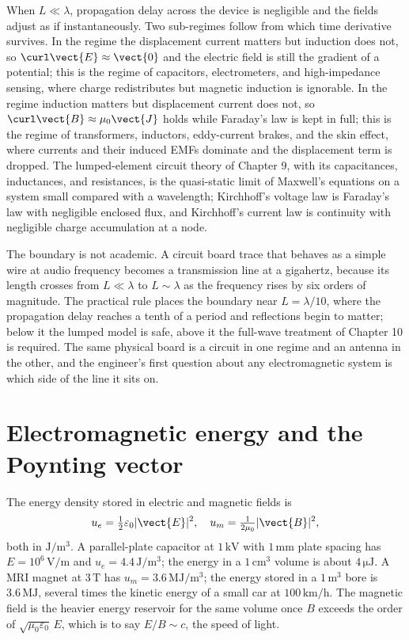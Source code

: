 

When $L\ll\lambda$, propagation delay across the device is negligible and
the fields adjust as if instantaneously. Two sub-regimes follow from
which time derivative survives. In the 
regime the displacement current matters but induction does not, so
$\curl\vect{E}\approx\vect{0}$ and the electric field is still the
gradient of a potential; this is the regime of capacitors, electrometers,
and high-impedance sensing, where charge redistributes but magnetic
induction is ignorable. In the  regime
induction matters but displacement current does not, so
$\curl\vect{B}\approx\mu_0\vect{J}$ holds while Faraday's law is kept in
full; this is the regime of transformers, inductors, eddy-current brakes,
and the skin effect, where currents and their induced EMFs dominate and
the displacement term is dropped. The lumped-element circuit theory of
Chapter 9, with its capacitances, inductances, and resistances, is the
quasi-static limit of Maxwell's equations on a system small compared with
a wavelength; Kirchhoff's voltage law is Faraday's law with negligible
enclosed flux, and Kirchhoff's current law is continuity with negligible
charge accumulation at a node.

The boundary is not academic. A circuit board trace that behaves as a
simple wire at audio frequency becomes a transmission line at a
gigahertz, because its length crosses from $L\ll\lambda$ to
$L\sim\lambda$ as the frequency rises by six orders of magnitude. The
practical rule places the boundary near $L = \lambda/10$, where the
propagation delay reaches a tenth of a period and reflections begin to
matter; below it the lumped model is safe, above it the full-wave
treatment of Chapter 10 is required. The same physical board is a circuit
in one regime and an antenna in the other, and the engineer's first
question about any electromagnetic system is which side of the line it
sits on.

\section{Electromagnetic energy and the Poynting vector}

The energy density stored in electric and magnetic fields is
\[
u_{e} = \tfrac{1}{2}\varepsilon_{0}|\vect{E}|^{2}, \quad u_{m} =
\tfrac{1}{2\mu_{0}}|\vect{B}|^{2},
\]
both in $\si{\joule\per\meter\cubed}$. A parallel-plate capacitor at
$1\,\si{\kilo\volt}$ with $1\,\si{\milli\meter}$ plate spacing has
$E = 10^{6}\,\si{\volt\per\meter}$ and $u_{e} = 4.4\,\si{\joule\per
\meter\cubed}$; the energy in a $1\,\si{\centi\meter\cubed}$ volume is
about $4\,\si{\micro\joule}$. A MRI magnet at $3\,\si{\tesla}$ has
$u_{m} = 3.6\,\si{\mega\joule\per\meter\cubed}$; the energy stored in a
$1\,\si{\meter\cubed}$ bore is $3.6\,\si{\mega\joule}$, several times
the kinetic energy of a small car at $100\,\si{\kilo\meter\per\hour}$.
The magnetic field is the heavier energy reservoir for the same volume
once $B$ exceeds the order of $\sqrt{\mu_{0}\varepsilon_{0}}\,E$,
which is to say $E/B \sim c$, the speed of light.

